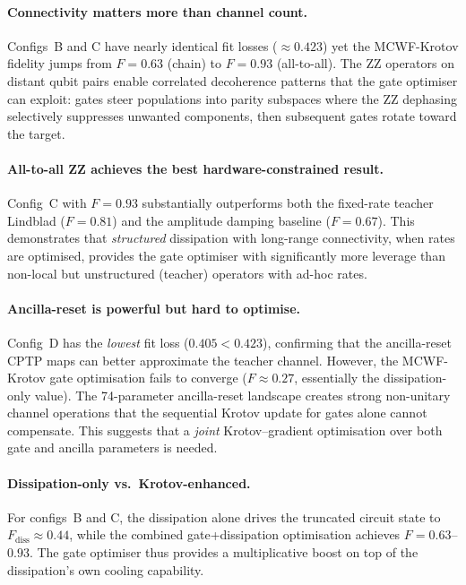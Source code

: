 \documentclass[11pt,a4paper]{article}
\begin{document}
\paragraph{Connectivity matters more than channel count.}
Configs~B and C have nearly identical fit losses ($\approx 0.423$)
yet the MCWF-Krotov fidelity jumps from $F = 0.63$ (chain) to
$F = 0.93$ (all-to-all).  The ZZ operators on distant qubit pairs
enable correlated decoherence patterns that the gate optimiser can
exploit: gates steer populations into parity subspaces where the ZZ
dephasing selectively suppresses unwanted components, then subsequent
gates rotate toward the target.

\paragraph{All-to-all ZZ achieves the best hardware-constrained result.}
Config~C with $F = 0.93$ substantially outperforms both the
fixed-rate teacher Lindblad ($F = 0.81$) and the amplitude damping
baseline ($F = 0.67$).  This demonstrates that \emph{structured}
dissipation with long-range connectivity, when rates are optimised,
provides the gate optimiser with significantly more leverage than
non-local but unstructured (teacher) operators with ad-hoc rates.

\paragraph{Ancilla-reset is powerful but hard to optimise.}
Config~D has the \emph{lowest} fit loss ($0.405 < 0.423$), confirming
that the ancilla-reset CPTP maps can better approximate the teacher
channel.  However, the MCWF-Krotov gate optimisation fails to converge
($F \approx 0.27$, essentially the dissipation-only value).  The
74-parameter ancilla-reset landscape creates strong non-unitary
channel operations that the sequential Krotov update for gates alone
cannot compensate.  This suggests that a \emph{joint} Krotov--gradient
optimisation over both gate and ancilla parameters is needed.

\paragraph{Dissipation-only vs.\ Krotov-enhanced.}
For configs~B and C, the dissipation alone drives the truncated circuit
state to $F_\text{diss} \approx 0.44$, while the combined
gate+dissipation optimisation achieves $F = 0.63$--$0.93$.  The gate
optimiser thus provides a multiplicative boost on top of the
dissipation's own cooling capability.
\end{document}
